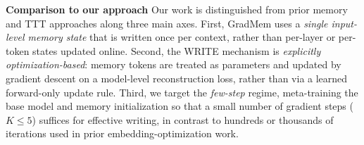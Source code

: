\documentclass{article}
\theoremstyle{plain}
\theoremstyle{definition}
\theoremstyle{remark}
\begin{document}
{\textbf{Comparison to our approach}
Our work is distinguished from prior memory and TTT approaches along three main axes.
First, GradMem uses a \emph{single input-level memory state} that is written once per context, rather than per-layer or per-token states updated online.
Second, the WRITE mechanism is \emph{explicitly optimization-based}: memory tokens are treated as parameters and updated by gradient descent on a model-level reconstruction loss, rather than via a learned forward-only update rule.
Third, we target the \emph{few-step} regime, meta-training the base model and memory initialization so that a small number of gradient steps ($K \leq 5$) suffices for effective writing, in contrast to hundreds or thousands of iterations used in prior embedding-optimization work.




}
\end{document}
